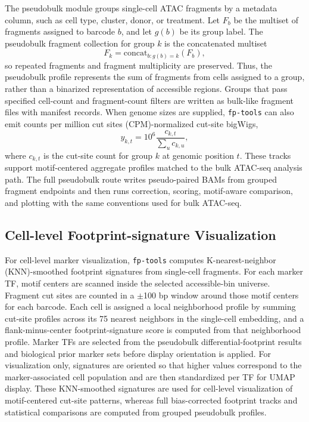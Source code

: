 \documentclass[biomedinformatics,article,submit,pdftex,moreauthors]{Definitions/mdpi}
\begin{document}
The pseudobulk module groups single-cell ATAC fragments by a metadata column,
such as cell type, cluster, donor, or treatment. Let $F_b$ be the multiset of
fragments assigned to barcode $b$, and let $g(b)$ be its group label. The
pseudobulk fragment collection for group $k$ is the concatenated multiset
\[
F_k = \mathrm{concat}_{b:g(b)=k}(F_b),
\]
so repeated fragments and fragment multiplicity are preserved. Thus, the
pseudobulk profile represents the sum of fragments from cells assigned to a
group, rather than a binarized representation of accessible regions. Groups that
pass specified cell-count and fragment-count filters are written as bulk-like
fragment files with manifest records. When genome sizes are supplied,
\texttt{fp-tools} can also emit counts per million cut sites (CPM)-normalized
cut-site bigWigs,
\[
y_{k,t}=10^6\frac{c_{k,t}}{\sum_u c_{k,u}},
\]
where $c_{k,t}$ is the cut-site count for group $k$ at genomic position $t$. These
tracks support motif-centered aggregate profiles matched to the bulk ATAC-seq
analysis path. The full pseudobulk route writes pseudo-paired BAMs from grouped
fragment endpoints and then runs correction, scoring, motif-aware comparison, and
plotting with the same conventions used for bulk ATAC-seq.

\subsection{Cell-level Footprint-signature Visualization}

For cell-level marker visualization, \texttt{fp-tools} computes
K-nearest-neighbor (KNN)-smoothed footprint signatures from single-cell fragments.
For each marker TF, motif centers are scanned inside the selected accessible-bin
universe. Fragment cut sites are counted in a $\pm$100 bp window around those
motif centers for each barcode. Each cell is assigned a local neighborhood
profile by summing cut-site profiles across its 75 nearest neighbors in the
single-cell embedding, and a flank-minus-center footprint-signature score is
computed from that neighborhood profile. Marker TFs are selected from the
pseudobulk differential-footprint results and biological prior marker sets before
display orientation is applied. For visualization only, signatures are oriented
so that higher values correspond to the marker-associated cell population and are
then standardized per TF for UMAP display. These KNN-smoothed signatures are
used for cell-level visualization of motif-centered cut-site patterns, whereas
full bias-corrected footprint tracks and statistical comparisons are computed
from grouped pseudobulk profiles.
\end{document}
